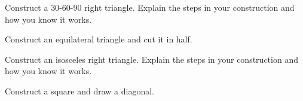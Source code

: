 \documentclass[nooutcomes]{ximera}
\begin{document}
\begin{problem}
Construct a $30$-$60$-$90$ right triangle. Explain the steps in your
  construction and how you know it works.
\begin{freeResponse}
\begin{hint}
Construct an equilateral triangle and cut it in half.  
\end{hint}
\end{freeResponse}
\end{problem}

\begin{problem}
Construct an isosceles right triangle. Explain the steps in your
  construction and how you know it works.
\begin{freeResponse}
\begin{hint}
Construct a square and draw a diagonal.  
\end{hint}
\end{freeResponse}
\end{problem}
\end{document}
